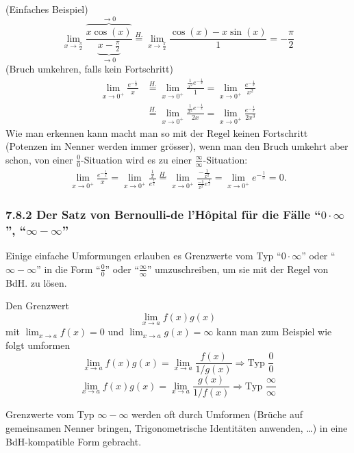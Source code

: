 \documentclass[a4paper,landscape,8pt]{extarticle}
\begin{document}
\begin{multicols*}{4}
\begin{warmup}
\Bsp (Einfaches Beispiel)
\[
\lim_{x\to\frac{\pi}{2}} \frac{\overbrace{x \cos(x)}^{\to 0}}{\underbrace{x -
\tfrac{\pi}{2}}_{\to 0}}
\stackrel{H.}{=}
\lim_{x\to\frac{\pi}{2}} \frac{\cos(x)-x\sin(x)}{1} = -\frac{\pi}{2}
\]
\Bsp (Bruch umkehren, falls kein Fortschritt)
\begin{align*}
\lim_{x\to 0^+} \frac{e^{-\frac{1}{x}}}{x} &\stackrel{H.}{=}
\lim_{x\to 0^+} \frac{\frac{1}{x^2}e^{-\frac{1}{x}}}{1} =
\lim_{x\to 0^+} \frac{e^{-\frac{1}{x}}}{x^2}\\
&\stackrel{H.}{=}
\lim_{x\to 0^+} \frac{\frac{1}{x^2}e^{-\frac{1}{x}}}{2x}
=\lim_{x\to 0^+} \frac{e^{-\frac{1}{x}}}{2x^3}
\end{align*}
Wie man erkennen kann macht man so mit der Regel keinen Fortschritt (Potenzen
im Nenner werden immer grösser), wenn man den Bruch umkehrt aber schon, von
einer $\frac{0}{0}$-Situation wird es zu einer
$\frac{\infty}{\infty}$-Situation:
\begin{align*}
\lim_{x\to 0^+} \frac{e^{-\frac{1}{x}}}{x}
= \lim_{x\to 0^+} \frac{\frac{1}{x}}{e^{\frac{1}{x}}} \stackrel{H.}{=}
\lim_{x\to 0^+} \frac{-\frac{1}{x^2}}{\frac{-1}{x^2}e^{\frac{1}{x}}}
= \lim_{x\to 0^+} e^{-\frac{1}{x}}=0.
\end{align*}
\end{warmup}

\subsubsection{7.8.2 Der Satz von Bernoulli-de l'Hôpital für die Fälle
``$0\cdot\infty$'', ``$\infty - \infty$''}

Einige einfache Umformungen erlauben es Grenzwerte vom Typ ``$0\cdot\infty$''
oder ``$\infty - \infty$'' in die Form ``$\frac{0}{0}$'' oder
``$\frac{\infty}{\infty}$'' umzuschreiben, um sie mit der Regel von BdH. zu
lösen.

Den Grenzwert
\[
\lim_{x\to a} f(x) g(x)
\]
mit $\lim_{x\to a}f(x)=0$ und $\lim_{x\to a}g(x)=\infty$ kann man zum Beispiel
wie folgt umformen
\[
\lim_{x\to a} f(x) g(x) = \lim_{x\to a} \frac{f(x)}{1/g(x)} 
\Longrightarrow \text{Typ } \frac{0}{0}
\]
\[
\lim_{x\to a} f(x) g(x) = \lim_{x\to a} \frac{g(x)}{1/f(x)} \Longrightarrow
\text{Typ } \frac{\infty}{\infty}
\]

Grenzwerte vom Typ $\infty - \infty$ werden oft durch Umformen (Brüche auf
gemeinsamen Nenner bringen, Trigonometrische Identitäten anwenden, \ldots) in
eine BdH-kompatible Form gebracht.


\end{multicols*}
\end{document}
